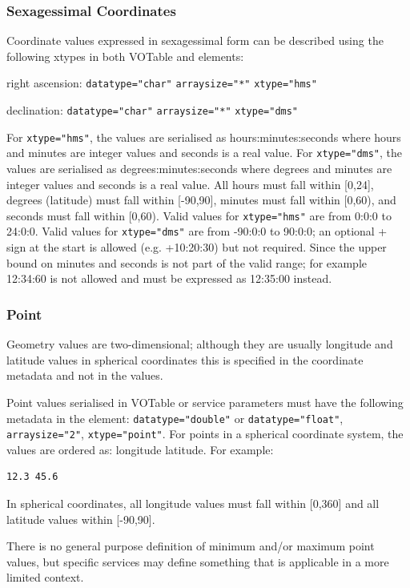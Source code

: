 \documentclass[11pt,letter]{ivoa}
\begin{document}
\subsubsection{Sexagessimal Coordinates}
Coordinate values expressed in sexagessimal form can be described using the following
xtypes in both VOTable  and  elements:

right ascension: \verb|datatype="char"| \verb|arraysize="*"| \verb|xtype="hms"|

declination: \verb|datatype="char"| \verb|arraysize="*"| \verb|xtype="dms"|

For \verb|xtype="hms"|, the values are serialised as hours:minutes:seconds where hours
and minutes are integer values and seconds is a real value. For \verb|xtype="dms"|, the values
are serialised as degrees:minutes:seconds where degrees and minutes are integer
values and seconds is a real value. All hours must fall within [0,24], degrees
(latitude) must fall within [-90,90], minutes must fall within [0,60), and seconds
must fall within [0,60). Valid values for \verb|xtype="hms"| are from 0:0:0 to 24:0:0.
Valid values for \verb|xtype="dms"| are from -90:0:0 to 90:0:0; an optional + sign at
the start is allowed (e.g. +10:20:30) but not required. Since the upper bound on minutes 
and seconds is not part of the valid range; for example 12:34:60 is not allowed and must 
be expressed as 12:35:00 instead.

\subsubsection{Point}
Geometry values are two-dimensional; although they are usually longitude and 
latitude values in spherical coordinates this is specified in the coordinate 
metadata and not in the values. 

Point values serialised in VOTable or service parameters must have the following metadata in the 
 element: \verb|datatype="double"| or \verb|datatype="float"|, \verb|arraysize="2"|,
\verb|xtype="point"|. For points in a 
spherical coordinate system, the values are ordered as: longitude latitude. For 
example:

\begin{verbatim}
12.3 45.6
\end{verbatim}

In spherical coordinates, all longitude values must fall within [0,360] and all 
latitude values within [-90,90].

There is no general purpose definition of minimum and/or maximum point values, but
specific services may define something that is applicable in a more limited context.
\end{document}
